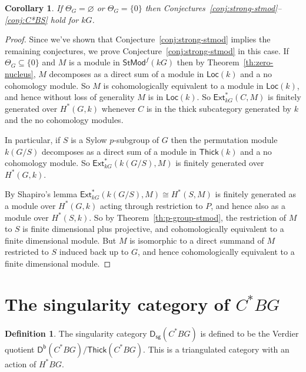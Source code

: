 \documentclass[12pt]{amsart}
\newcommand{\DD}{\mathsf{D}}%
\newcommand{\Db}{\DD^{\mathsf{b}}}%
\newcommand{\Dsg}{\DD_{\mathsf{sg}}}%
\newcommand{\Ext}{\mathsf{Ext}}
\newcommand{\kG}{\kk G}
\newcommand{\kk}{k}
\newcommand{\Loc}{\mathsf{Loc}}
\newcommand{\StMod}{\mathsf{StMod}}
\newcommand{\Thick}{\mathsf{Thick}}
\numberwithin{equation}{section}
\theoremstyle{plain}
\newtheorem{corollary}[equation]{Corollary}
\theoremstyle{definition}
\newtheorem{definition}[equation]{Definition}
\theoremstyle{remark}
\begin{document}
\begin{corollary}\label{co:zero-nucleus}
If $\Theta_G=\varnothing$ or $\Theta_G=\{0\}$ then
Conjectures~\ref{conj:strong-stmod}--\ref{conj:C*BS} hold for $\kG$.
\end{corollary}
\begin{proof}
Since we've shown that Conjecture~\ref{conj:strong-stmod} implies the
remaining conjectures, we prove Conjecture~\ref{conj:strong-stmod}
in this case.
If $\Theta_G\subseteq\{0\}$ and $M$ is a module in $\StMod^f(\kG)$ then
by Theorem~\ref{th:zero-nucleus}, $M$
decomposes as a direct sum of a module in $\Loc(\kk)$ and
a no cohomology module. So $M$ is cohomologically equivalent to a 
module in $\Loc(\kk)$, and hence without loss of generality $M$ is
in $\Loc(\kk)$. So $\Ext^*_{\kG}(C,M)$ is finitely generated
over $H^*(G,\kk)$ whenever $C$ is in the thick subcategory generated
by $\kk$ and the no cohomology modules.

In particular, if $S$ is a Sylow $p$-subgroup of $G$ then the
permutation module $\kk(G/S)$ decomposes as a direct sum
of a module in $\Thick(\kk)$ and a no cohomology module.
So $\Ext^*_{\kG}(\kk(G/S),M)$ is finitely generated over $H^*(G,\kk)$.

By Shapiro's lemma $\Ext^*_{\kG}(\kk(G/S),M)\cong H^*(S,M)$ is finitely
  generated as a module over $H^*(G,\kk)$ acting through restriction
  to $P$, and hence also as a module over $H^*(S,\kk)$. So by
Theorem~\ref{th:p-group-stmod}, the restriction of $M$ to $S$ is finite dimensional plus
projective, and cohomologically equivalent to a finite dimensional
module. But $M$ is isomorphic to a direct summand of $M$ restricted to
$S$ induced back up to $G$, and hence cohomologically equivalent to a
finite dimensional module.
\end{proof}


\section{\texorpdfstring{The singularity category of $C^*BG$}
  {The singularity category of C*BG}}

\begin{definition}
The singularity category $\Dsg(C^*BG)$ is defined to be the Verdier
quotient $\Db(C^*BG)/\Thick(C^*BG)$. This is a triangulated category
with an action of $H^*BG$.
\end{definition}
\end{document}
